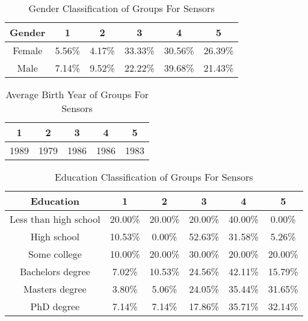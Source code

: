 \begin{table}[h!]
  \centering
  \caption{Gender Classification of Groups For Sensors}
  \label{tab:gender_sensors}
  \begin{tabular}{cccccc}
    \toprule
     Gender&1&2&3&4&5 \\
    \midrule
Female&5.56\%&4.17\%&33.33\%&30.56\%&26.39\% \\
Male&7.14\%&9.52\%&22.22\%&39.68\%&21.43\% \\
    \bottomrule
  \end{tabular}
\end{table}



\begin{table}[h!]
  \centering
  \caption{Average Birth Year of Groups For Sensors}
  \label{tab:year_sensors}
  \begin{tabular}{ccccc}
    \toprule
     1&2&3&4&5\\
    \midrule
	1989& 1979& 1986& 1986& 1983\\
    \bottomrule
  \end{tabular}
\end{table}


\begin{table}[h!]
  \centering
  \caption{Education Classification of Groups For Sensors}
  \label{tab:edu_sensors}
  \begin{tabular}{cccccc}
    \toprule
     Education&1&2&3&4&5\\
    \midrule
    
Less than high school&20.00\%&20.00\%&20.00\%&40.00\%&0.00\%\\
High school&10.53\%&0.00\%&52.63\%&31.58\%&5.26\%\\
Some college&10.00\%&20.00\%&30.00\%&20.00\%&20.00\%\\
Bachelors degree&7.02\%&10.53\%&24.56\%&42.11\%&15.79\%\\
Masters degree&3.80\%&5.06\%&24.05\%&35.44\%&31.65\%\\
PhD degree&7.14\%&7.14\%&17.86\%&35.71\%&32.14\%\\
    \bottomrule
  \end{tabular}
\end{table} 










